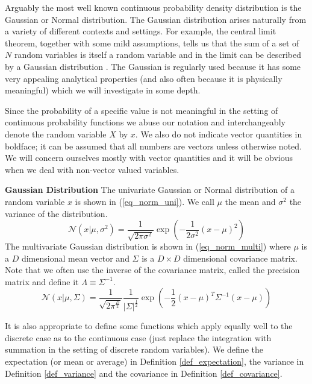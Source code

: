 Arguably the most well known continuous probability density distribution is the Gaussian or Normal distribution. The Gaussian distribution arises naturally from a variety of different contexts and settings. For example, the central limit theorem, together with some mild assumptions, tells us that the sum of a set of $N$ random  variables is itself a random variable and in the limit can be described by a Gaussian distribution \cite{bishop}. The Gaussian is regularly used because it has some very appealing analytical properties (and also often because it is physically meaningful) which we will investigate in some depth. 

Since the probability of a specific value is not meaningful in the setting of continuous probability functions we abuse our notation and interchangeably denote the random variable $X$ by $x$. We also do not indicate vector quantities in boldface; it can be assumed that all numbers are vectors unless otherwise noted. We will concern ourselves mostly with vector quantities and it will be obvious when we deal with non-vector valued variables. 
\begin{defn}
\textbf{Gaussian Distribution} The univariate Gaussian or Normal distribution of a random variable $x$ is shown in (\ref{eq_norm_uni}). We call $\mu$ the mean and $\sigma^2$ the variance of the distribution.
\begin{equation}
\mathcal{N}(x|\mu, \sigma^2) = \frac{1}{\sqrt{2\pi\sigma^2}}\exp\left(-\frac{1}{2\sigma^2}(x-\mu)^2\right)
\label{eq_norm_uni}
\end{equation}
The multivariate Gaussian distribution is shown in (\ref{eq_norm_multi}) where $\mu$ is a $D$ dimensional mean vector and $\Sigma$ is a $D \times D$ dimensional covariance matrix. Note that we often use the inverse of the covariance matrix, called the precision matrix and define it $\Lambda \equiv \Sigma^{-1}$.
\begin{equation}
\mathcal{N}(x|\mu, \Sigma) = \frac{1}{\sqrt{2\pi^{\frac{D}{2}}}}\frac{1}{|\Sigma|^{\frac{1}{2}}}\exp\left(-\frac{1}{2}(x-\mu)^T\Sigma^{-1}(x-\mu)\right)
\label{eq_norm_multi}
\end{equation}
\label{defn_gauss}
\end{defn}
It is also appropriate to define some functions which apply equally well to the discrete case as to the continuous case (just replace the integration with summation in the setting of discrete random variables). We define the expectation (or mean or average) in Definition \ref{def_expectation}, the variance in Definition \ref{def_variance} and the covariance in Definition \ref{def_covariance}. 
